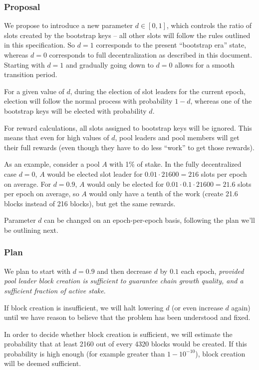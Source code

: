 \documentclass[11pt,a4paper]{article}
\begin{document}
\subsubsection{Proposal}\label{proposal}

We propose to introduce a new parameter \(d\in[0,1]\), which controls
the ratio of slots created by the bootstrap keys -- all other slots will
follow the rules outlined in this specification. So \(d=1\) corresponds
to the present ``bootstrap era'' state, whereas \(d=0\) corresponds to
full decentralization as described in this document. Starting with
\(d=1\) and gradually going down to \(d=0\) allows for a smooth
transition period.

For a given value of \(d\), during the election of slot leaders for the
current epoch, election will follow the normal process with probability
\(1-d\), whereas one of the bootstrap keys will be elected with
probability \(d\).

For reward calculations, all slots assigned to bootstrap keys will be
ignored. This means that even for high values of \(d\), pool leaders and
pool members will get their full rewards (even though they have to do
less ``work'' to get those rewards).

As an example, consider a pool \(A\) with 1\% of stake. In the fully
decentralized case \(d=0\), \(A\) would be elected slot leader for
\(0.01\cdot 21600=216\) slots per epoch on average. For \(d=0.9\), \(A\)
would only be elected for \(0.01\cdot 0.1\cdot 21600=21.6\) slots per
epoch on average, so \(A\) would only have a tenth of the work (create
21.6 blocks instead of 216 blocks), but get the same rewards.

Parameter \(d\) can be changed on an epoch-per-epoch basis, following
the plan we'll be outlining next.

\subsubsection{Plan}\label{plan}

We plan to start with \(d=0.9\) and then decrease \(d\) by \(0.1\) each
epoch, \emph{provided pool leader block creation is sufficient to
guarantee chain growth quality, and a sufficient fraction of active
stake}.

If block creation is insufficient, we will halt lowering \(d\) (or even
increase \(d\) again) until we have reason to believe that the problem
has been understood and fixed.

In order to decide whether block creation is sufficient, we will
estimate the probability that at least 2160 out of every 4320 blocks
would be created. If this probability is high enough (for example
greater than \(1 - 10^{-10}\)), block creation will be deemed
sufficient.
\end{document}

